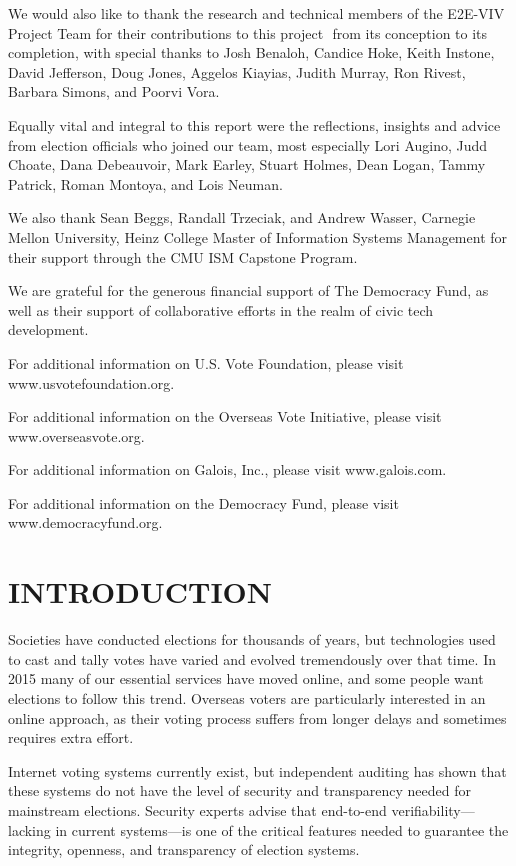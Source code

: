 We would also like to thank the research and technical members of the
E2E-VIV Project Team for their contributions to this project  from its
conception to its completion, with special thanks to Josh Benaloh,
Candice Hoke, Keith Instone, David Jefferson, Doug Jones, Aggelos
Kiayias, Judith Murray, Ron Rivest, Barbara Simons, and Poorvi Vora. 

Equally vital and integral to this report were the reflections,
insights and advice from election officials who joined our team, most
especially Lori Augino, Judd Choate, Dana Debeauvoir, Mark Earley,
Stuart Holmes, Dean Logan, Tammy Patrick, Roman Montoya, and Lois
Neuman.

We also thank Sean Beggs, Randall Trzeciak, and Andrew Wasser,
Carnegie Mellon University, Heinz College Master of Information
Systems Management for their support through the CMU ISM Capstone
Program. 

We are grateful for the generous financial support of The Democracy
Fund, as well as their support of collaborative efforts in the realm
of civic tech development. 

For additional information on U.S. Vote Foundation, please visit
www.usvotefoundation.org.   

For additional information on the Overseas Vote Initiative, please
visit www.overseasvote.org. 

For additional information on Galois, Inc., please visit
www.galois.com.

For additional information on the Democracy Fund, please visit
www.democracyfund.org.  

\newpage

\section*{INTRODUCTION}

Societies have conducted elections for thousands of years, but
technologies used to cast and tally votes have varied and evolved
tremendously over that time. In 2015 many of our essential services
have moved online, and some people want elections to follow this
trend. Overseas voters are particularly interested in an online
approach, as their voting process suffers from longer delays and
sometimes requires extra effort.

Internet voting systems currently exist, but independent auditing has
shown that these systems do not have the level of security and
transparency needed for mainstream elections. Security experts advise
that end-to-end verifiability—lacking in current systems—is one of the
critical features needed to guarantee the integrity, openness, and
transparency of election systems.

